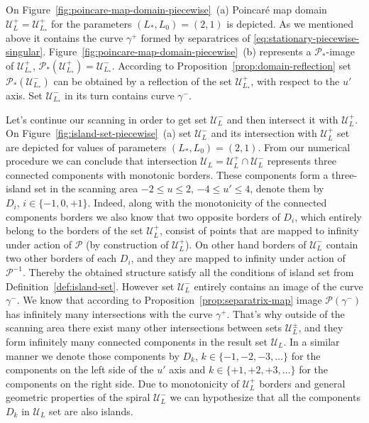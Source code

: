 On Figure~\ref{fig:poincare-map-domain-piecewise}~(a) Poincar\'e map   domain $\mathscr{U}_L^+ = \mathscr{U}_{L_*}^+$ for the parameters $(L_*, L_0) = (2, 1)$ is depicted.
As we mentioned above it contains the curve $\gamma^+$ formed by separatrices of \eqref{eq:stationary-piecewise-singular}.
Figure~\ref{fig:poincare-map-domain-piecewise}~(b) represents a $\mathcal{P}_*$-image of $\mathscr{U}_{L_*}^+$, $\mathcal{P}_* (\mathscr{U}_{L_*}^+) = \mathscr{U}_{L_*}^-$.
According to Proposition~\ref{prop:domain-reflection} set $\mathcal{P}_*(\mathscr{U}_{L_*}^-)$ can be obtained by a reflection of the set $\mathscr{U}_{L_*}^+$, with respect to the $u'$ axis.
Set $\mathscr{U}_{L_*}^-$ in its turn contains curve $\gamma^-$.

Let's continue our scanning in order to get set $\mathscr{U}_L^-$ and then intersect it with $\mathscr{U}_L^+$.
On Figure~\ref{fig:island-set-piecewise}~(a) set $\mathscr{U}_L^-$ and its intersection with $\mathscr{U}_L^+$ set are depicted for values of parameters $(L_*, L_0) = (2, 1)$.
From our numerical procedure we can conclude that intersection $\mathscr{U}_L = \mathscr{U}_L^+ \cap \mathscr{U}_L^-$ represents three connected components with monotonic borders.
These components form a three-island set in the scanning area $-2 \le u \le 2$, $-4 \le u' \le 4$, denote them by $D_i, \, i \in \{ -1, 0, +1 \}$.
Indeed, along with the monotonicity of the connected components borders we also know that two opposite borders of $D_i$, which entirely belong to the borders of the set $\mathscr{U}_L^+$, consist of points that are mapped to infinity under action of $\mathcal{P}$ (by construction of $\mathscr{U}_L^+$).
On other hand borders of $\mathscr{U}_L^-$ contain two other borders of each $D_i$, and they are mapped to infinity under action of $\mathcal{P}^{-1}$.
Thereby the obtained structure satisfy all the conditions of island set from Definition~\ref{def:island-set}.
However set $\mathscr{U}_L^-$ entirely contains an image of the curve $\gamma^-$.
We know that according to Proposition~\ref{prop:separatrix-map} image $\mathcal{P}(\gamma^-)$ has infinitely many intersections with the curve $\gamma^+$.
That's why outside of the scanning area there exist many other intersections between sets $\mathscr{U}_L^{\pm}$, and they form infinitely many connected components in the result set $\mathscr{U}_L$.
In a similar manner we denote those components by $D_k$, $k \in \{ -1, -2, -3, \dots \}$ for the components on the left side of the $u'$ axis and $k \in \{ +1, +2, +3, \dots \}$ for the components on the right side. 
Due to monotonicity of $\mathscr{U}_L^+$ borders and general geometric properties of the spiral $\mathscr{U}_L^-$ we can hypothesize that all the components $D_k$ in $\mathscr{U}_L$ set are also islands.

